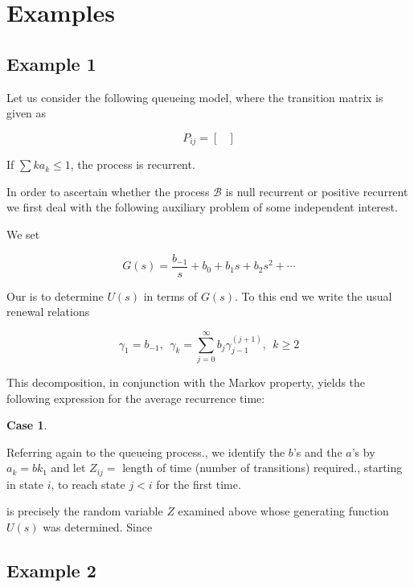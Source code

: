 \documentclass[12pt]{article}
\theoremstyle{nonumberbreak}
\begin{document}


\section{Examples}

\subsection{Example 1}

Let us consider the following queueing model, where the transition matrix is given as

$$
P_{ij} = \begin{bmatrix}
\end{bmatrix}
$$


If $\sum k a_k \le 1$, the process is recurrent.

In order to ascertain whether the process $\mathcal{B}$ is null recurrent or positive recurrent we first deal with the following auxiliary problem of some independent interest.

We set 

$$
G(s) = \frac{b_{-1}}{s} + b_0 + b_1 s + b_2 s^2 + \cdots
$$


Our is to determine $U(s)$ in terms of $G(s)$. To this end we write the usual renewal relations 

$$
\gamma_1 = b_{-1}, \ \ \gamma_k = \sum_{j=0}^\infty b_j \gamma_{j-1}^{(j+1)}, \ \ k \ge 2
$$

This decomposition, in conjunc­tion with the Markov property, yields the following expression for the average recurrence time:



\textbf{Case 1}. 


Referring again to the queueing process., we identify the $b$'s and the $a$'s by $a_k = bk _ 1$ and let $Z_{ij} =$ length of time (number of transitions) re­quired., starting in state $i$, to reach state $j < i$ for the first time. 

is precisely the random variable $Z$ examined above whose generating function $U(s)$ was determined. Since


\subsection{Example 2}
\end{document}
